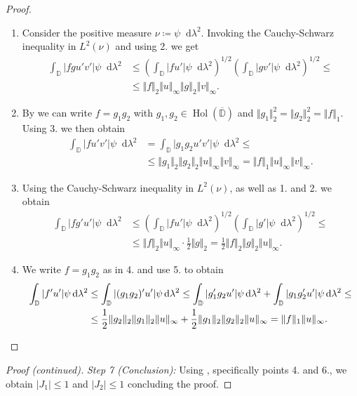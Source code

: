 \documentclass[letterpaper, 11pt]{article}
\newcommand{\D}{\mathbb{D}}
\newcommand{\1}{\mathds{1}}
\newcommand{\dd}{\mathop{}\!\mathrm{d}}
\newcommand{\cl}[1]{\overline{#1}}
\DeclareMathOperator*{\Hol}{Hol}
\theoremstyle{definition}
\begin{document}
\begin{proof} {\ }
\begin{enumerate}
    \item Consider the positive measure $\nu \coloneqq \psi \dd \lambda^2$. Invoking the Cauchy-Schwarz inequality in $L^2(\nu)$ and using 2. we get
    \begin{align*}
      \int_\D \vert f g u' v' \vert \psi \dd \lambda^2 &\leq \left( \int_\D \vert f u' \vert \psi \dd \lambda^2 \right)^{1/2} \left( \int_\D \vert g v' \vert \psi \dd \lambda^2 \right)^{1/2} \leq \\
      &\leq \Vert f \Vert_2 \Vert u \Vert_\infty \Vert g \Vert_2 \Vert v \Vert_\infty.
    \end{align*}

    \item By  we can write $f = g_1 g_2$ with $g_1, g_2 \in \Hol(\cl{\D})$ and $\Vert g_1 \Vert_2^2 = \Vert g_2 \Vert_2^2 = \Vert f \Vert_1$. Using 3. we then obtain
    \begin{align*}
      \int_\D \vert f u' v' \vert \psi \dd \lambda^2 &= \int_\D \vert g_1 g_2 u' v' \vert \psi \dd \lambda^2 \leq \\
      &\leq \Vert g_1 \Vert_2 \Vert g_2 \Vert_2 \Vert u \Vert_\infty \Vert v \Vert_\infty = \Vert f \Vert_1 \Vert u \Vert_\infty \Vert v \Vert_\infty.
    \end{align*}

    \item Using the Cauchy-Schwarz inequality in $L^2(\nu)$, as well as 1. and 2. we obtain
    \begin{align*}
      \displaystyle \int_\D \vert f g' u' \vert \psi \dd \lambda^2 &\leq \left( \int_\D \vert f u' \vert \psi \dd \lambda^2 \right)^{1/2} \left( \int_\D \vert g' \vert \psi \dd \lambda^2 \right)^{1/2} \leq \\
      &\leq \Vert f \Vert_2 \Vert u \Vert_\infty \cdot \frac{1}{2} \Vert g \Vert_2 = \frac{1}{2} \Vert f \Vert_2 \Vert g \Vert_2 \Vert u \Vert_\infty.
    \end{align*}

    \item We write $f = g_1 g_2$ as in 4. and use 5. to obtain
    \begin{align*}
      \int_\D \vert f' u' \vert \psi \dd \lambda^2 &\leq \int_\D \vert (g_1 g_2)' u' \vert \psi \dd \lambda^2 \leq \int_\D \vert g_1' g_2 u' \vert \psi \dd \lambda^2 + \int_\D \vert g_1 g_2' u' \vert \psi \dd \lambda^2 \leq \\
      &\leq \frac{1}{2} \Vert g_2 \Vert_2 \Vert g_1 \Vert_2 \Vert u \Vert_\infty + \frac{1}{2} \Vert g_1 \Vert_2 \Vert g_2 \Vert_2 \Vert u \Vert_\infty = \Vert f \Vert_1 \Vert u \Vert_\infty. \qedhere
    \end{align*}
  \end{enumerate}
\end{proof}

\begin{proof}[Proof (continued)]
  \textit{Step 7 (Conclusion):} Using , specifically points 4. and 6., we obtain $\vert J_1 \vert \leq 1$ and $\vert J_2 \vert \leq 1$ concluding the proof.
\end{proof}
\end{document}

